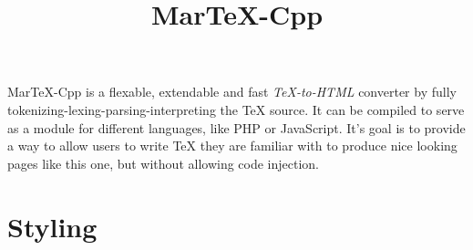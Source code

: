 \begin{page}
%
%
\newcommand\descriptor[2]{
\textbf{#1}
\begin{paragraph}#2\end{paragraph}%
}%
%

\title{MarTeX-Cpp}

MarTeX-Cpp is a flexable, extendable and fast \textit{TeX-to-HTML} converter by fully tokenizing-lexing-parsing-interpreting the TeX source. It can be compiled to serve as a module for different languages, like PHP or JavaScript. It's goal is to provide a way to allow users to write TeX they are familiar with to produce nice looking pages like this one, but without allowing code injection.
        
\section{Styling}


\end{page}
